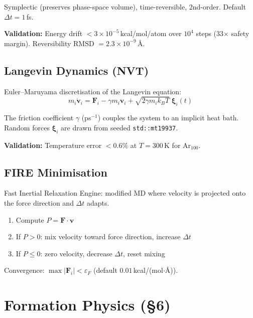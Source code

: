 \documentclass[11pt, a4paper]{article}
\begin{document}
Symplectic (preserves phase-space volume), time-reversible, 2nd-order.  Default $\Delta t = 1$\,fs.

\textbf{Validation:} Energy drift $< 3 \times 10^{-5}$\,kcal/mol/atom over $10^4$ steps (33$\times$ safety margin).  Reversibility RMSD $= 2.3 \times 10^{-9}$\,\AA.

\subsection{Langevin Dynamics (NVT)}

Euler--Maruyama discretisation of the Langevin equation:
\begin{equation}
m_i \dot{\mathbf{v}}_i = \mathbf{F}_i - \gamma m_i \mathbf{v}_i + \sqrt{2\gamma m_i k_B T}\;\boldsymbol{\xi}_i(t)
\end{equation}

The friction coefficient $\gamma$ (ps$^{-1}$) couples the system to an implicit heat bath.  Random forces $\boldsymbol{\xi}_i$ are drawn from seeded \texttt{std::mt19937}.

\textbf{Validation:} Temperature error $< 0.6\%$ at $T = 300$\,K for Ar$_{100}$.

\subsection{FIRE Minimisation}

Fast Inertial Relaxation Engine: modified MD where velocity is projected onto the force direction and $\Delta t$ adapts.

\begin{enumerate}
\item Compute $P = \mathbf{F} \cdot \mathbf{v}$
\item If $P > 0$: mix velocity toward force direction, increase $\Delta t$
\item If $P \le 0$: zero velocity, decrease $\Delta t$, reset mixing
\end{enumerate}

Convergence: $\max|\mathbf{F}_i| < \varepsilon_F$ (default $0.01$\,kcal/(mol$\cdot$\AA)).


\section{Formation Physics (\S6)}
\end{document}
